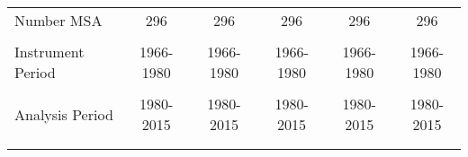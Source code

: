 \begin{tabular}{lccccc}
    Number MSA & 296 & 296 & 296 & 296 & 296 \\
    \vspace{-2pt} & \vspace{-2pt} & \vspace{-2pt} & \vspace{-2pt} & \vspace{-2pt} \\
    Instrument Period & 1966-1980 & 1966-1980 & 1966-1980 & 1966-1980 & 1966-1980 \\
    \vspace{-2pt} & \vspace{-2pt} & \vspace{-2pt} & \vspace{-2pt} & \vspace{-2pt} \\
    Analysis Period & 1980-2015 & 1980-2015 & 1980-2015 & 1980-2015 & 1980-2015 \\ 
    \vspace{-2pt} & \vspace{-2pt} & \vspace{-2pt} & \vspace{-2pt} & \vspace{-2pt} \\ \hline

    \vspace{-2pt} & \vspace{-2pt} & \vspace{-2pt} & \vspace{-2pt}
    
    \end{tabular}
